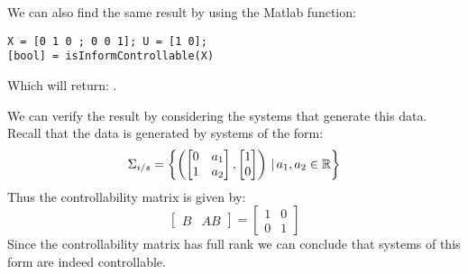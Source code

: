 We can also find the same result by using the Matlab function:
\begin{lstlisting}
X = [0 1 0 ; 0 0 1]; U = [1 0];
[bool] = isInformControllable(X)
\end{lstlisting}
Which will return: \mon{[ 1 ]}.

We can verify the result by considering the systems that generate this data. Recall that the data is generated by systems of the form:
\[ \Sigma_{i/s} = \left\{ \left( \begin{bmatrix} 0&a_1 \\ 1&a_2 \end{bmatrix}, \begin{bmatrix} 1 \\ 0 \end{bmatrix} \right) \, | \, a_1, a_2 \in \mathbb{R} \right\} \]
Thus the controllability matrix is given by:
\[ \begin{bmatrix} B& AB \end{bmatrix} = \begin{bmatrix} 1 & 0 \\ 0 & 1 \end{bmatrix} \]
Since the controllability matrix has full rank we can conclude that systems of this form are indeed controllable.
































